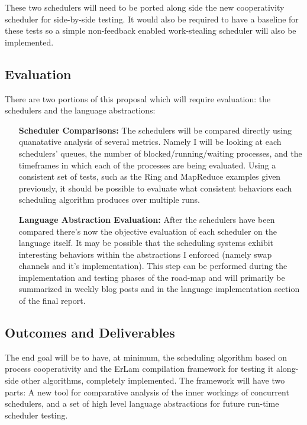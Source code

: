These two schedulers will need to be ported along side the new cooperativity scheduler for side-by-side testing. It
would also be required to have a baseline for these tests so a simple non-feedback enabled work-stealing scheduler
will also be implemented.

\subsection{Evaluation}
\label{sec:workevaluation}

There are two portions of this proposal which will require evaluation: the schedulers and the language abstractions:

\begin{itemize}
\item[{\bf Scheduler Comparisons:}] The schedulers will be compared directly using quanatative analysis of several
metrics. Namely I will be looking at each schedulers' queues, the number of blocked/running/waiting processes, and
the timeframes in which each of the processes are being evaluated. Using a consistent set of tests, such as the 
Ring and MapReduce examples given previously, it should be possible to evaluate what consistent behaviors each 
scheduling algorithm produces over multiple runs.

\item[{\bf Language Abstraction Evaluation:}] After the schedulers have been compared there's now the objective
	evaluation of each scheduler on the language itself. It may be possible that the scheduling systems
	exhibit interesting behaviors within the abstractions I enforced (namely swap channels and it's 
	implementation). This step can be performed during the implementation and testing phases of the 
	road-map and will primarily be summarized in weekly blog posts and in the language implementation
	section of the final report.

\end{itemize}

\subsection{Outcomes and Deliverables}
\label{sec:outcomes}

The end goal will be to have, at minimum, the scheduling algorithm based on process cooperativity and 
the ErLam compilation framework for testing it along-side other algorithms, completely implemented. The 
framework will have two parts: A new tool for comparative analysis of the inner workings of concurrent 
schedulers, and a set of high level language abstractions for future run-time scheduler testing.

